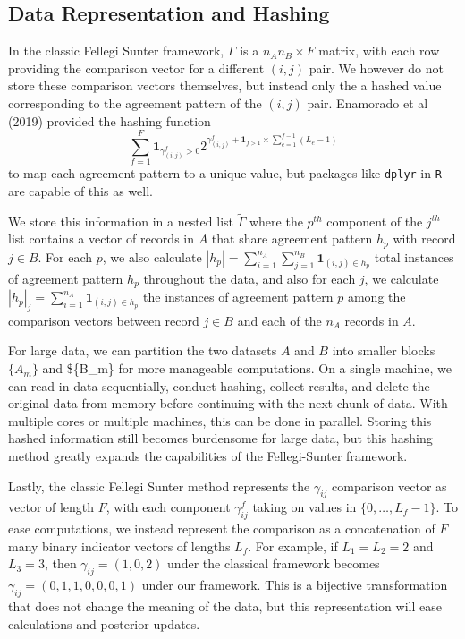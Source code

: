 \documentclass[
  12pt,
]{article}
\begin{document}
\hypertarget{data-representation-and-hashing}{%
\subsection{Data Representation and
Hashing}\label{data-representation-and-hashing}}

In the classic Fellegi Sunter framework, \(\Gamma\) is a
\(n_A n_B \times F\) matrix, with each row providing the comparison
vector for a different \((i,j)\) pair. We however do not store these
comparison vectors themselves, but instead only the a hashed value
corresponding to the agreement pattern of the \((i, j)\) pair. Enamorado
et al (2019) provided the hashing function
\[\sum_{f=1}^F \mathbf{1}_{\gamma_{(i,j)}^f >0}2^{\gamma_{(i,j)}^f + \mathbf{1}_{f>1} \times \sum_{e=1}^{f-1}(L_e-1)}\]
to map each agreement pattern to a unique value, but packages like
\texttt{dplyr} in \texttt{R} are capable of this as well.

We store this information in a nested list \(\tilde{\Gamma}\) where the
\(p^{th}\) component of the \(j^{th}\) list contains a vector of records
in \(A\) that share agreement pattern \(h_p\) with record \(j \in B\).
For each \(p\), we also calculate
\(|h_p| = \sum_{i=1}^{n_A}\sum_{j=1}^{n_B} \mathbf{1}_{(i,j) \in h_p}\)
total instances of agreement pattern \(h_p\) throughout the data, and
also for each \(j\), we calculate
\(|h_p|_j = \sum_{i=1}^{n_A} \mathbf{1}_{(i,j) \in h_p}\) the instances
of agreement pattern \(p\) among the comparison vectors between record
\(j \in B\) and each of the \(n_A\) records in \(A\).

For large data, we can partition the two datasets \(A\) and \(B\) into
smaller blocks \(\{A_m\}\) and \$\{B\_m\} for more manageable
computations. On a single machine, we can read-in data sequentially,
conduct hashing, collect results, and delete the original data from
memory before continuing with the next chunk of data. With multiple
cores or multiple machines, this can be done in parallel. Storing this
hashed information still becomes burdensome for large data, but this
hashing method greatly expands the capabilities of the Fellegi-Sunter
framework.

Lastly, the classic Fellegi Sunter method represents the \(\gamma_{ij}\)
comparison vector as vector of length \(F\), with each component
\(\gamma_{ij}^f\) taking on values in \(\{0, \ldots, L_f - 1\}\). To
ease computations, we instead represent the comparison as a
concatenation of \(F\) many binary indicator vectors of lengths \(L_f\).
For example, if \(L_1 = L_2 = 2\) and \(L_3 = 3\), then
\(\gamma_{ij} = (1, 0, 2)\) under the classical framework becomes
\(\gamma_{ij} = (0, 1, 1, 0, 0, 0, 1)\) under our framework. This is a
bijective transformation that does not change the meaning of the data,
but this representation will ease calculations and posterior updates.
\end{document}

